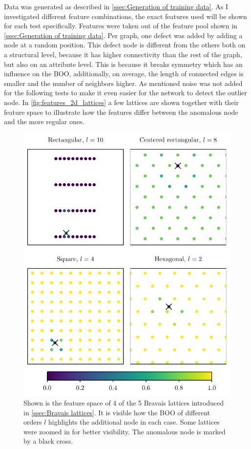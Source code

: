 \documentclass[11pt,a4paper]{article}
\begin{document}
Data was generated as described in \autoref{ssec:Generation of training data}. 
As I investigated different feature combinations, the exact features used will be shown for each test specifically. 
Features were taken out of the feature pool shown in \autoref{ssec:Generation of training data}. 
Per graph, one defect was added by adding a node at a random position. 
This defect node is different from the others both on a structural level, because it has higher connectivity than the rest of the graph, but also on an attribute level. 
This is because it breaks symmetry which has an influence on the BOO, additionally, on average, the length of connected edges is smaller and the number of neighbors higher. 
As mentioned noise was not added for the following tests to make it even easier for the network to detect the outlier node. 
In \autoref{fig:features_2d_lattices} a few lattices are shown together with their feature space to illustrate how the features differ between the anomalous node and the more regular ones. \\

\begin{figure}[htbp]
    \centering
    \includegraphics{images/plots/features_2d_lattices.pdf}
    \caption{Shown is the feature space of 4 of the 5 Bravais lattices introduced in \autoref{ssec:Bravais lattices}. It is visible how the BOO of different orders $l$ highlights the additional node in each case. Some lattices were zoomed in for better visibility. The anomalous node is marked by a black cross.}
    \label{fig:features_2d_lattices}
\end{figure}
\end{document}
